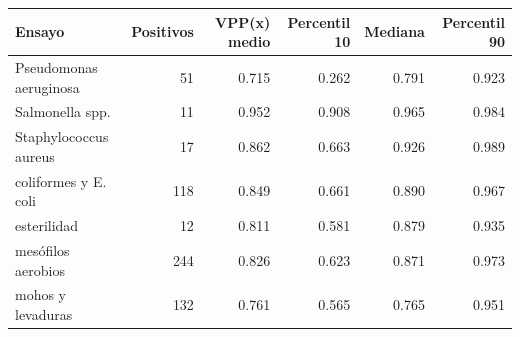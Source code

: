\begin{tabular}{lrrrrr}
\toprule
Ensayo & Positivos & VPP(x) medio & Percentil 10 & Mediana & Percentil 90 \\
\midrule
Pseudomonas aeruginosa & 51 & 0.715 & 0.262 & 0.791 & 0.923 \\
Salmonella spp. & 11 & 0.952 & 0.908 & 0.965 & 0.984 \\
Staphylococcus aureus & 17 & 0.862 & 0.663 & 0.926 & 0.989 \\
coliformes y E. coli & 118 & 0.849 & 0.661 & 0.890 & 0.967 \\
esterilidad & 12 & 0.811 & 0.581 & 0.879 & 0.935 \\
mesófilos aerobios & 244 & 0.826 & 0.623 & 0.871 & 0.973 \\
mohos y levaduras & 132 & 0.761 & 0.565 & 0.765 & 0.951 \\
\bottomrule
\end{tabular}
